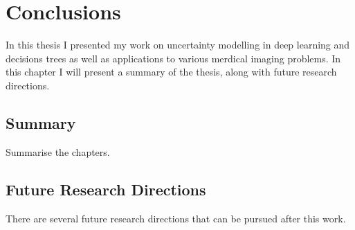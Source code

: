 \chapter{Conclusions}
\label{chapter:conclusions}

In this thesis I presented my work on uncertainty modelling in deep learning and decisions trees as well as applications to various merdical imaging problems. In this chapter I will present a summary of the thesis, along with future research directions. 

\section{Summary}
\label{sec:conSum}
Summarise the chapters. 

\section{Future Research Directions}
There are several future research directions that can be pursued after this work.
